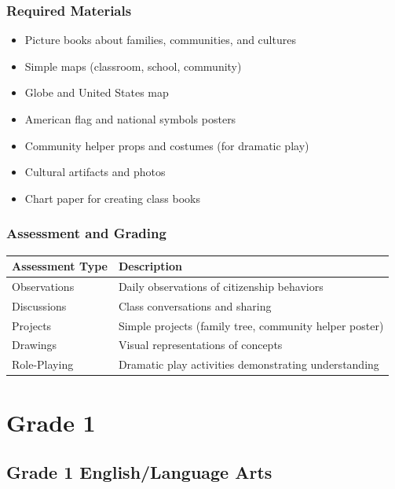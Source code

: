 \documentclass[11pt,letterpaper]{report}
\begin{document}
\section{Required Materials}

\begin{itemize}
    \item Picture books about families, communities, and cultures
    \item Simple maps (classroom, school, community)
    \item Globe and United States map
    \item American flag and national symbols posters
    \item Community helper props and costumes (for dramatic play)
    \item Cultural artifacts and photos
    \item Chart paper for creating class books
\end{itemize}

\section{Assessment and Grading}

\begin{center}
\begin{tabular}{|l|p{8cm}|}
\hline
\textbf{Assessment Type} & \textbf{Description} \\
\hline
Observations & Daily observations of citizenship behaviors \\
\hline
Discussions & Class conversations and sharing \\
\hline
Projects & Simple projects (family tree, community helper poster) \\
\hline
Drawings & Visual representations of concepts \\
\hline
Role-Playing & Dramatic play activities demonstrating understanding \\
\hline
\end{tabular}
\end{center}

\clearpage

\part{Grade 1}

\chapter{Grade 1 English/Language Arts}
\end{document}
